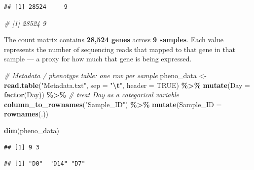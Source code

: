 \documentclass[
]{article}
\newenvironment{Shaded}{\begin{snugshade}}{\end{snugshade}}
\newcommand{\AttributeTok}[1]{\textcolor[rgb]{0.13,0.29,0.53}{#1}}
\newcommand{\CommentTok}[1]{\textcolor[rgb]{0.56,0.35,0.01}{\textit{#1}}}
\newcommand{\ConstantTok}[1]{\textcolor[rgb]{0.56,0.35,0.01}{#1}}
\newcommand{\FunctionTok}[1]{\textcolor[rgb]{0.13,0.29,0.53}{\textbf{#1}}}
\newcommand{\NormalTok}[1]{#1}
\newcommand{\OtherTok}[1]{\textcolor[rgb]{0.56,0.35,0.01}{#1}}
\newcommand{\SpecialCharTok}[1]{\textcolor[rgb]{0.81,0.36,0.00}{\textbf{#1}}}
\newcommand{\StringTok}[1]{\textcolor[rgb]{0.31,0.60,0.02}{#1}}
\begin{document}
\begin{verbatim}
## [1] 28524     9
\end{verbatim}

\begin{Shaded}
\begin{Highlighting}[]
\CommentTok{\# [1] 28524     9}
\end{Highlighting}
\end{Shaded}

The count matrix contains \textbf{28,524 genes} across \textbf{9
samples}. Each value represents the number of sequencing reads that
mapped to that gene in that sample --- a proxy for how much that gene is
being expressed.

\begin{Shaded}
\begin{Highlighting}[]
\CommentTok{\# Metadata / phenotype table: one row per sample}
\NormalTok{pheno\_data }\OtherTok{\textless{}{-}} \FunctionTok{read.table}\NormalTok{(}\StringTok{"Metadata.txt"}\NormalTok{, }\AttributeTok{sep =} \StringTok{"}\SpecialCharTok{\textbackslash{}t}\StringTok{"}\NormalTok{, }\AttributeTok{header =} \ConstantTok{TRUE}\NormalTok{) }\SpecialCharTok{\%\textgreater{}\%}
  \FunctionTok{mutate}\NormalTok{(}\AttributeTok{Day =} \FunctionTok{factor}\NormalTok{(Day)) }\SpecialCharTok{\%\textgreater{}\%}              \CommentTok{\# treat Day as a categorical variable}
  \FunctionTok{column\_to\_rownames}\NormalTok{(}\StringTok{"Sample\_ID"}\NormalTok{) }\SpecialCharTok{\%\textgreater{}\%}
  \FunctionTok{mutate}\NormalTok{(}\AttributeTok{Sample\_ID =} \FunctionTok{rownames}\NormalTok{(.))}

\FunctionTok{dim}\NormalTok{(pheno\_data)}
\end{Highlighting}
\end{Shaded}

\begin{verbatim}
## [1] 9 3
\end{verbatim}

\begin{Shaded}
\end{Shaded}

\begin{verbatim}
## [1] "D0"  "D14" "D7"
\end{verbatim}
\end{document}
